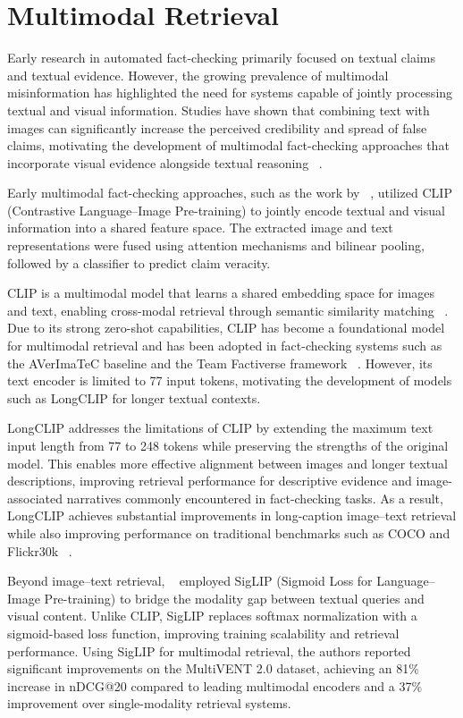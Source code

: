 \section{Multimodal Retrieval}

Early research in automated fact-checking primarily focused on textual claims and textual evidence. However, the growing prevalence of multimodal misinformation has highlighted the need for systems capable of jointly processing textual and visual information. Studies have shown that combining text with images can significantly increase the perceived credibility and spread of false claims, motivating the development of multimodal fact-checking approaches that incorporate visual evidence alongside textual reasoning ~\cite{Hameleers2020Feb}.


Early multimodal fact-checking approaches, such as the work by ~\citet{Xu2024Mar}, utilized CLIP  (Contrastive Language–Image Pre-training) to jointly encode textual and visual information into a shared feature space. The extracted image and text representations were fused using attention mechanisms and bilinear pooling, followed by a classifier to predict claim veracity.

CLIP is a multimodal model that learns a shared embedding space for images and text, enabling cross-modal retrieval through semantic similarity matching ~\cite{Radford2021Feb}. Due to its strong zero-shot capabilities, CLIP has become a foundational model for multimodal retrieval and has been adopted in fact-checking systems such as the AVerImaTeC baseline and the Team Factiverse framework ~\cite{Cao2026Mar}. However, its text encoder is limited to 77 input tokens, motivating the development of models such as LongCLIP for longer textual contexts.

LongCLIP addresses the limitations of CLIP by extending the maximum text input length from 77 to 248 tokens while preserving the strengths of the original model. This enables more effective alignment between images and longer textual descriptions, improving retrieval performance for descriptive evidence and image-associated narratives commonly encountered in fact-checking tasks. As a result, LongCLIP achieves substantial improvements in long-caption image–text retrieval while also improving performance on traditional benchmarks such as COCO and Flickr30k ~\cite{Zhang2024Mar}.

Beyond image–text retrieval, ~\citet{Samuel2025Jul} employed SigLIP (Sigmoid Loss for Language–Image Pre-training) to bridge the modality gap between textual queries and visual content. Unlike CLIP, SigLIP replaces softmax normalization with a sigmoid-based loss function, improving training scalability and retrieval performance. Using SigLIP for multimodal retrieval, the authors reported significant improvements on the MultiVENT 2.0 dataset, achieving an 81\% increase in nDCG@20 compared to leading multimodal encoders and a 37\% improvement over single-modality retrieval systems.

